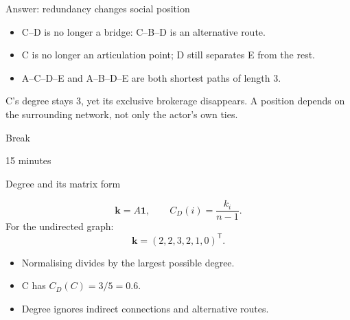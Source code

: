 \documentclass[aspectratio=169,11pt]{beamer}
\newcommand{\ones}{\mathbf{1}}
\begin{document}
\begin{frame}{Answer: redundancy changes social position}

\begin{itemize}
\item C--D is no longer a bridge: C--B--D is an alternative route.
\medskip\item C is no longer an articulation point; D still separates E from the rest.
\medskip\item A--C--D--E and A--B--D--E are both shortest paths of length 3.
\end{itemize}
\medskip
C's degree stays 3, yet its exclusive brokerage disappears.
\textcolor{accent}{A position depends on the surrounding network, not only the actor's own ties.}


\end{frame}

\begin{frame}{Break}

\begin{center}\Large 15 minutes\end{center}


\end{frame}

\begin{frame}{Degree and its matrix form}

\[\mathbf{k}=A\ones,\qquad C_D(i)=\frac{k_i}{n-1}.\]
For the undirected graph:
\[\mathbf{k}=(2,2,3,2,1,0)^{\mathsf T}.\]
\begin{itemize}
\item Normalising divides by the largest possible degree.
\medskip\item C has $C_D(C)=3/5=0.6$.
\medskip\item Degree ignores indirect connections and alternative routes.
\end{itemize}


\end{frame}
\end{document}
